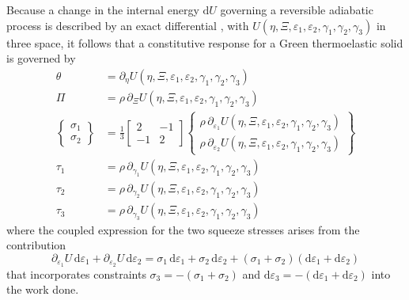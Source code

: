 Because a change in the internal energy $\mathrm{d} U$ governing a reversible adiabatic process is described by an exact differential \cite{Caratheodory09}, with $U( \eta, \Xi, \varepsilon_1 , \varepsilon_2 , \gamma_1 , \gamma_2 , \gamma_3 )$ in three space, it follows that a constitutive response for a Green thermo\-elastic solid is governed by \cite{Freed17}
\begin{subequations}
    \label{GreenThermoelasticSolid}
\begin{align}
\theta & = \partial_{\eta} U( \eta, \Xi, \varepsilon_1 , \varepsilon_2 , \gamma_1 , \gamma_2 , \gamma_3 ) \\
\Pi & = \rho \, \partial_{\Xi} U( \eta, \Xi, \varepsilon_1 , \varepsilon_2 , \gamma_1 , \gamma_2 , \gamma_3 )  \\
\left\{ \begin{matrix}
\sigma_1 \\ \sigma_2
\end{matrix} \right\} & = \frac{1}{3} \begin{bmatrix}
2 & -1 \\ -1 & 2
\end{bmatrix} \left\{ \begin{matrix}
\rho \, \partial_{\varepsilon_1} U( \eta, \Xi, \varepsilon_1 , \varepsilon_2 , \gamma_1 , \gamma_2 , \gamma_3 ) \\
\rho \, \partial_{\varepsilon_2} U( \eta, \Xi, \varepsilon_1 , \varepsilon_2 , \gamma_1 , \gamma_2 , \gamma_3 )
\end{matrix} \right\} \\
\tau_1 & = \rho \, \partial_{\gamma_1} U( \eta, \Xi, \varepsilon_1 , \varepsilon_2 , \gamma_1 , \gamma_2 , \gamma_3 ) \\
\tau_2 & = \rho \, \partial_{\gamma_2} U( \eta, \Xi, \varepsilon_1 , \varepsilon_2 , \gamma_1 , \gamma_2 , \gamma_3 ) \\
\tau_3 & = \rho \, \partial_{\gamma_3} U( \eta, \Xi, \varepsilon_1 , \varepsilon_2 , \gamma_1 , \gamma_2 , \gamma_3 ) 
\end{align}
\end{subequations}
where the coupled expression for the two squeeze stresses arises from the contribution
\begin{displaymath}
    \partial_{\varepsilon_1} U \, \mathrm{d} \varepsilon_1 +
    \partial_{\varepsilon_2} U \, \mathrm{d} \varepsilon_2 = 
    \sigma_1 \, \mathrm{d} \varepsilon_1 +
    \sigma_2 \, \mathrm{d} \varepsilon_2 + 
    (\sigma_1 + \sigma_2) (\mathrm{d} \varepsilon_1 + \mathrm{d} \varepsilon_2)
\end{displaymath}
that incorporates constraints $\sigma_3 = -(\sigma_1 + \sigma_2)$ and $\mathrm{d} \varepsilon_3 = -( \mathrm{d} \varepsilon_1 + \mathrm{d} \varepsilon_2 )$ into the work done.

